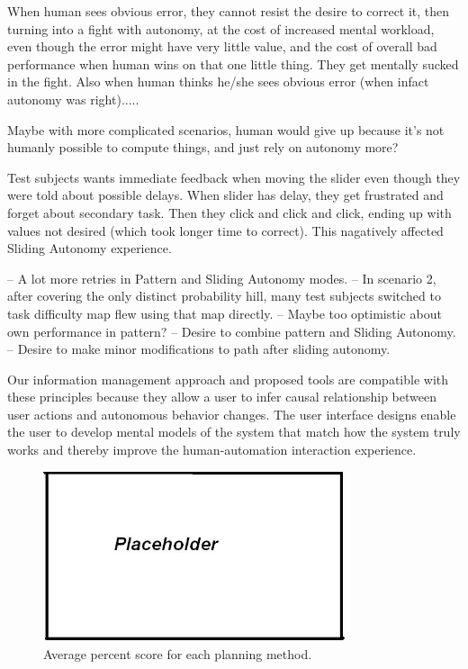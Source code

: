 \documentclass[journal]{IEEEtran}
\begin{document}
When human sees obvious error, they cannot resist the desire to correct it, then turning into a fight with autonomy, at the cost of increased mental workload, even though the error might have very little value, and the cost of overall bad performance when human wins on that one little thing. They get mentally sucked in the fight. Also when human thinks he/she sees obvious error (when infact autonomy was right).....

Maybe with more complicated scenarios, human would give up because it's not humanly possible to compute things, and just rely on autonomy more?

Test subjects wants immediate feedback when moving the slider even though they were told about possible delays. When slider has delay, they get frustrated and forget about secondary task. Then they click and click and click, ending up with values not desired (which took longer time to correct). This nagatively affected Sliding Autonomy experience.


-- A lot more retries in Pattern and Sliding Autonomy modes.
-- In scenario 2, after covering the only distinct probability hill, many test subjects switched to task difficulty map flew using that map directly.
-- Maybe too optimistic about own performance in pattern?
-- Desire to combine pattern and Sliding Autonomy.
-- Desire to make minor modifications to path after sliding autonomy.

Our information management approach and proposed tools are compatible with these principles because they allow a user to infer causal relationship between user actions and autonomous behavior changes. The user interface designs enable the user to develop mental models of the system that match how the system truly works and thereby improve the human-automation interaction experience.


\begin{figure}
\centering
\includegraphics[width=3.5in]{placeholder.JPG}
\caption{Average percent score for each planning method.}
\label{PercentScoreGraph}
\end{figure}
\end{document}
